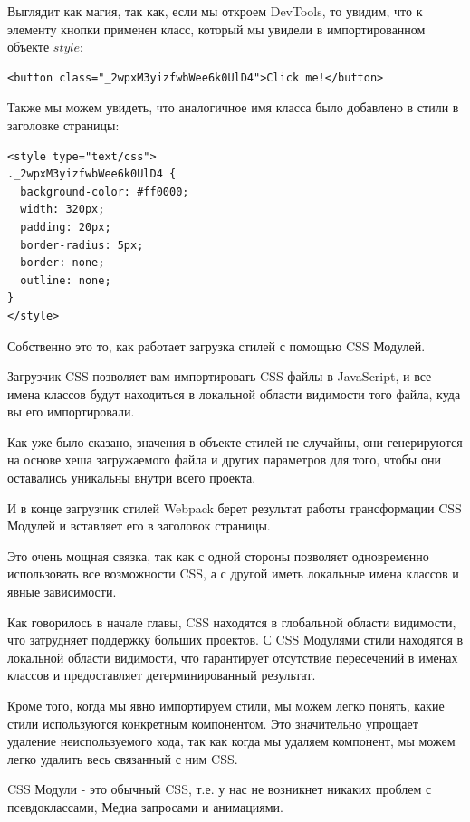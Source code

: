 Выглядит как магия, так как, если мы откроем DevTools, то увидим, что к элементу кнопки применен класс, который мы увидели в импортированном объекте $style$:

\begin{lstlisting}
<button class="_2wpxM3yizfwbWee6k0UlD4">Click me!</button>
\end{lstlisting}

Также мы можем увидеть, что аналогичное имя класса было добавлено в стили в заголовке страницы:

\begin{lstlisting}
<style type="text/css">
._2wpxM3yizfwbWee6k0UlD4 {
  background-color: #ff0000;
  width: 320px;
  padding: 20px;
  border-radius: 5px;
  border: none;
  outline: none;
} 
</style>
\end{lstlisting}

Собственно это то, как работает загрузка стилей с помощью CSS Модулей.

Загрузчик CSS позволяет вам импортировать CSS файлы в JavaScript, и все имена классов будут находиться в локальной области видимости того файла, куда вы его импортировали.

Как уже было сказано, значения в объекте стилей не случайны, они генерируются на основе хеша загружаемого файла и других параметров для того, чтобы они оставались уникальны внутри всего проекта.

И в конце загрузчик стилей Webpack берет результат работы трансформации CSS Модулей и вставляет его в заголовок страницы.

Это очень мощная связка, так как с одной стороны позволяет одновременно использовать все возможности CSS, а с другой иметь локальные имена классов и явные зависимости.

Как говорилось в начале главы, CSS находятся в глобальной области видимости, что затрудняет поддержку больших проектов. С CSS Модулями стили находятся в локальной области видимости, что гарантирует отсутствие пересечений в именах классов и предоставляет детерминированный результат.

Кроме того, когда мы явно импортируем стили, мы можем легко понять, какие стили используются конкретным компонентом. Это значительно упрощает удаление неиспользуемого кода, так как когда мы удаляем компонент, мы можем легко удалить весь связанный с ним CSS.

CSS Модули - это обычный CSS, т.е. у нас не возникнет никаких проблем с псевдоклассами, Медиа запросами и анимациями.

